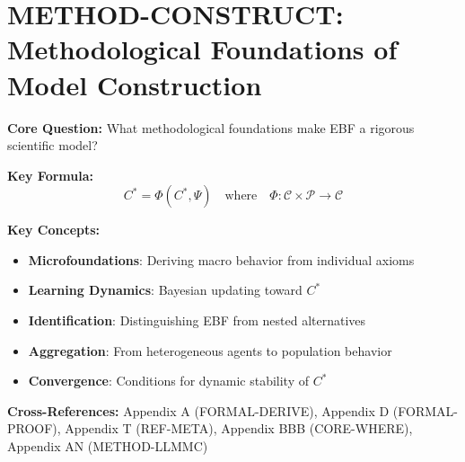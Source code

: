 \chapter{METHOD-CONSTRUCT: Methodological Foundations of Model Construction}
\label{app:az-construct}

\begin{abstract}
This appendix addresses five fundamental methodological challenges in constructing
EBF: (1) Microfoundations---how axioms derive from primitive assumptions;
(2) Learning Theory---how agents form and update expectations;
(3) Dynamic Adjustment---how systems converge to reference structure $C^*$;
(4) Heterogeneity and Aggregation---how individual differences scale;
(5) Identification and Model Comparison---how to distinguish EBF from alternatives.
These foundations ensure EBF meets rigorous standards of economic methodology.
\end{abstract}

\begin{tcolorbox}[colback=blue!5!white, colframe=blue!75!black,
    title=Quick Reference: METHOD-CONSTRUCT]

\textbf{Core Question:} What methodological foundations make EBF a rigorous scientific model?

\textbf{Key Formula:}
\begin{equation}
C^* = \Phi(C^*, \Psi) \quad \text{where} \quad \Phi: \mathcal{C} \times \mathcal{P} \to \mathcal{C}
\end{equation}

\textbf{Key Concepts:}
\begin{itemize}[nosep]
\item \textbf{Microfoundations}: Deriving macro behavior from individual axioms
\item \textbf{Learning Dynamics}: Bayesian updating toward $C^*$
\item \textbf{Identification}: Distinguishing EBF from nested alternatives
\item \textbf{Aggregation}: From heterogeneous agents to population behavior
\item \textbf{Convergence}: Conditions for dynamic stability of $C^*$
\end{itemize}

\textbf{Cross-References:} Appendix A (FORMAL-DERIVE), Appendix D (FORMAL-PROOF),
Appendix T (REF-META), Appendix BBB (CORE-WHERE), Appendix AN (METHOD-LLMMC)
\end{tcolorbox}



